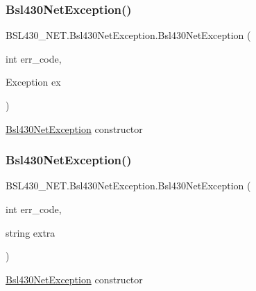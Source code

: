 \mbox{\label{class_b_s_l430___n_e_t_1_1_bsl430_net_exception_a2e6a4d74e4dece76316cfd777178087b}} 
\subsubsection{\texorpdfstring{Bsl430NetException()}{Bsl430NetException()}\hspace{0.1cm}{\footnotesize\ttfamily [4/5]}}
{\footnotesize\ttfamily B\+S\+L430\+\_\+\+N\+E\+T.\+Bsl430\+Net\+Exception.\+Bsl430\+Net\+Exception (\begin{DoxyParamCaption}\item[{int}]{err\+\_\+code,  }\item[{Exception}]{ex }\end{DoxyParamCaption})}



\mbox{\hyperlink{class_b_s_l430___n_e_t_1_1_bsl430_net_exception}{Bsl430\+Net\+Exception}} constructor 

\mbox{\label{class_b_s_l430___n_e_t_1_1_bsl430_net_exception_a62e05fca7f91b8abbbe59db70f2443c2}} 
\subsubsection{\texorpdfstring{Bsl430NetException()}{Bsl430NetException()}\hspace{0.1cm}{\footnotesize\ttfamily [5/5]}}
{\footnotesize\ttfamily B\+S\+L430\+\_\+\+N\+E\+T.\+Bsl430\+Net\+Exception.\+Bsl430\+Net\+Exception (\begin{DoxyParamCaption}\item[{int}]{err\+\_\+code,  }\item[{string}]{extra }\end{DoxyParamCaption})}



\mbox{\hyperlink{class_b_s_l430___n_e_t_1_1_bsl430_net_exception}{Bsl430\+Net\+Exception}} constructor 



